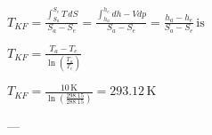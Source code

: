 \( T_{KF} = \frac{\int_{S_a}^{S_e} T \, dS}{S_a - S_e} = \frac{\int_{h_a}^{h_e} dh - V dp}{S_a - S_e} = \frac{h_a - h_e}{S_a - S_e} \, \text{is} \)  

\( T_{KF} = \frac{T_a - T_e}{\ln \left( \frac{T_a}{T_e} \right)} \)  

\( T_{KF} = \frac{10 \, \text{K}}{\ln \left( \frac{298.15}{288.15} \right)} = 293.12 \, \text{K} \)  

---
